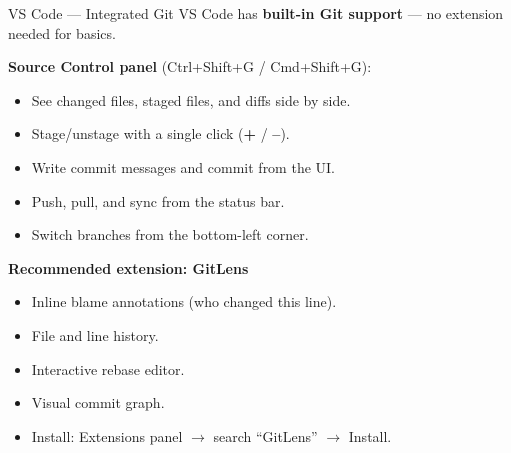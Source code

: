 \documentclass[aspectratio=169, 11pt]{beamer}
\begin{document}
\begin{frame}{VS Code --- Integrated Git}
  VS Code has \textbf{built-in Git support} --- no extension needed for basics.

  \vspace{0.5em}
  \textbf{Source Control panel} (Ctrl+Shift+G / Cmd+Shift+G):
  \begin{itemize}
    \item See changed files, staged files, and diffs side by side.
    \item Stage/unstage with a single click (\textbf{+} / \textbf{--}).
    \item Write commit messages and commit from the UI.
    \item Push, pull, and sync from the status bar.
    \item Switch branches from the bottom-left corner.
  \end{itemize}

  \vspace{0.5em}
  \textbf{Recommended extension: GitLens}
  \begin{itemize}
    \item Inline blame annotations (who changed this line).
    \item File and line history.
    \item Interactive rebase editor.
    \item Visual commit graph.
    \item Install: Extensions panel $\to$ search ``GitLens'' $\to$ Install.
  \end{itemize}
\end{frame}
\end{document}

